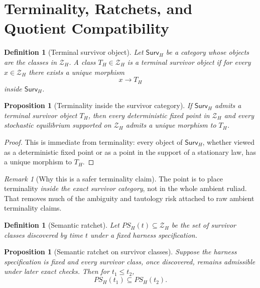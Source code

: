 \documentclass[11pt]{article}
\newtheorem{proposition}[theorem]{Proposition}
\newtheorem{definition}[theorem]{Definition}
\theoremstyle{remark}
\newtheorem{remark}[theorem]{Remark}
\theoremstyle{plain}
\begin{document}
\section{Terminality, Ratchets, and Quotient Compatibility}
\label{sec:categorical}

\begin{definition}[Terminal survivor object]
Let \(\mathsf{Surv}_H\) be a category whose objects are the classes in \(\mathcal Z_H\). A class \(T_H\in\mathcal Z_H\) is a terminal survivor object if for every \(x\in\mathcal Z_H\) there exists a unique morphism
\[
x\to T_H
\]
inside \(\mathsf{Surv}_H\).
\end{definition}

\begin{proposition}[Terminality inside the survivor category]
\label{prop:terminal}
If \(\mathsf{Surv}_H\) admits a terminal survivor object \(T_H\), then every deterministic fixed point in \(\mathcal Z_H\) and every stochastic equilibrium supported on \(\mathcal Z_H\) admits a unique morphism to \(T_H\).
\end{proposition}

\begin{proof}
This is immediate from terminality: every object of \(\mathsf{Surv}_H\), whether viewed as a deterministic fixed point or as a point in the support of a stationary law, has a unique morphism to \(T_H\).
\end{proof}

\begin{remark}[Why this is a safer terminality claim]
The point is to place terminality \emph{inside the exact survivor category}, not in the whole ambient ruliad. That removes much of the ambiguity and tautology risk attached to raw ambient terminality claims.
\end{remark}

\begin{definition}[Semantic ratchet]
Let \(PS_H(t)\subseteq \mathcal Z_H\) be the set of survivor classes discovered by time \(t\) under a fixed harness specification.
\end{definition}

\begin{proposition}[Semantic ratchet on survivor classes]
\label{prop:ratchet}
Suppose the harness specification is fixed and every survivor class, once discovered, remains admissible under later exact checks. Then for \(t_1\le t_2\),
\[
PS_H(t_1)\subseteq PS_H(t_2).
\]
\end{proposition}
\end{document}
